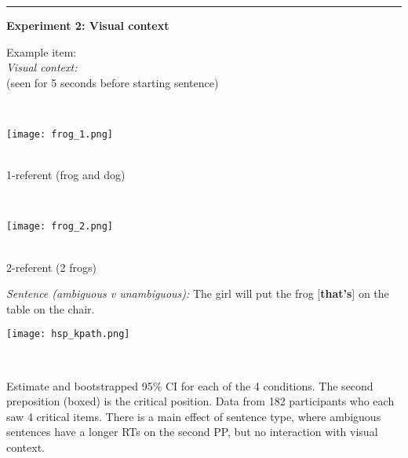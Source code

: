 \documentclass[11pt,a4paper]{article}
\begin{document}
	\smallskip
	\rule{\textwidth}{1pt}
	\begin{center}\textbf{Experiment 2: Visual context}\end{center}
	
	\begin{minipage}{.3\textwidth}
		\begin{small}Example item:\\\textit{Visual context:} \\ (seen for 5 seconds before starting sentence) 
		
		\end{small}
	\end{minipage}	~~~
	\begin{minipage}{.3\textwidth}
		\texttt{[image: frog\_1.png]}		\begin{small}\\
			1-referent (frog and dog) 
			
			\end{small}
		
	\end{minipage}
	~~~
	\begin{minipage}{.3\textwidth}	
		\texttt{[image: frog\_2.png]}
		\begin{small}\\ 2-referent (2 frogs) 
		
		\end{small}
		
	\end{minipage}
	
	\begin{minipage}{\textwidth}
		\begin{small}
			\textit{Sentence (ambiguous v unambiguous):} The girl will put the frog [\textbf{that's}] on the table on the chair.
			
		\end{small}
		
	\end{minipage}
	
	\vspace{10pt}
	\begin{minipage}{.65\textwidth}
		{	\texttt{[image: hsp\_kpath.png]}} 
		
	\end{minipage}
	~~~
	\begin{minipage}{.3\textwidth}		\begin{small}
			
			Estimate and bootstrapped 95\% CI for each of the 4 conditions. The second preposition (boxed) is the critical position. Data from 182 participants who each saw 4 critical items. There is a main effect of sentence type, where ambiguous sentences have a longer RTs on the second PP, but no interaction with visual context. 
			
		\end{small}
	\end{minipage}
	
\end{document}
